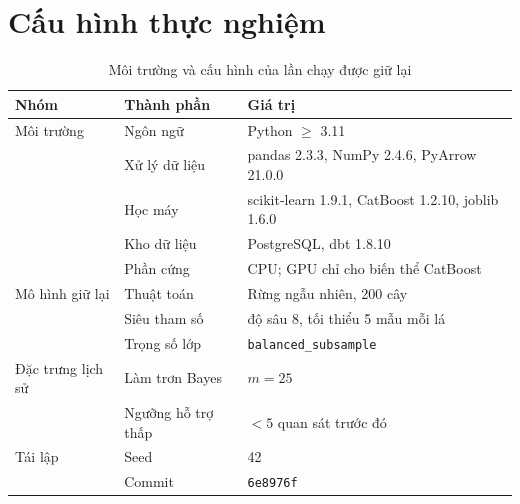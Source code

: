 \section{Cấu hình thực nghiệm}\label{app:env}
\begin{table}[htbp]\centering\small
\caption{Môi trường và cấu hình của lần chạy được giữ lại}\label{tab:app-env}
\begin{tabular}{p{2.6cm}p{4.2cm}p{6.6cm}}
\toprule
Nhóm & Thành phần & Giá trị \\
\midrule
Môi trường & Ngôn ngữ & Python $\geq$ 3.11 \\
           & Xử lý dữ liệu & pandas 2.3.3, NumPy 2.4.6, PyArrow 21.0.0 \\
           & Học máy & scikit-learn 1.9.1, CatBoost 1.2.10, joblib 1.6.0 \\
           & Kho dữ liệu & PostgreSQL, dbt 1.8.10 \\
           & Phần cứng & CPU; GPU chỉ cho biến thể CatBoost \\
\midrule
Mô hình giữ lại & Thuật toán & Rừng ngẫu nhiên, 200 cây \\
           & Siêu tham số & độ sâu 8, tối thiểu 5 mẫu mỗi lá \\
           & Trọng số lớp & \texttt{balanced\_subsample} \\
\midrule
Đặc trưng lịch sử & Làm trơn Bayes & $m = 25$ \\
           & Ngưỡng hỗ trợ thấp & $< 5$ quan sát trước đó \\
\midrule
Tái lập    & Seed & 42 \\
           & Commit & \texttt{6e8976f} \\
\bottomrule
\end{tabular}
\end{table}
